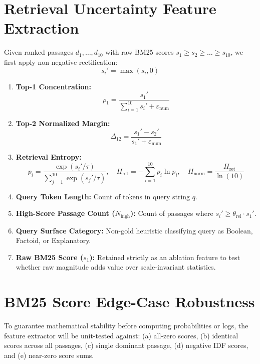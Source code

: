 \documentclass[11pt,a4paper]{article}
\begin{document}
\section{Retrieval Uncertainty Feature Extraction}
Given ranked passages $d_1, \dots, d_{10}$ with raw BM25 scores $s_1 \ge s_2 \ge \dots \ge s_{10}$, we first apply non-negative rectification:
\begin{equation}
s_i' = \max(s_i, 0)
\end{equation}
\begin{enumerate}
    \item \textbf{Top-1 Concentration:}
    \begin{equation}
    \rho_1 = \frac{s_1'}{\sum_{i=1}^{10} s_i' + \varepsilon_{\text{num}}}
    \end{equation}
    \item \textbf{Top-2 Normalized Margin:}
    \begin{equation}
    \Delta_{12} = \frac{s_1' - s_2'}{s_1' + \varepsilon_{\text{num}}}
    \end{equation}
    \item \textbf{Retrieval Entropy:}
    \begin{equation}
    p_i = \frac{\exp(s_i' / \tau)}{\sum_{j=1}^{10} \exp(s_j' / \tau)}, \quad H_{\text{ret}} = -\sum_{i=1}^{10} p_i \ln p_i, \quad H_{\text{norm}} = \frac{H_{\text{ret}}}{\ln(10)}
    \end{equation}
    \item \textbf{Query Token Length:} Count of tokens in query string $q$.
    \item \textbf{High-Score Passage Count ($N_{\text{high}}$):} Count of passages where $s_i' \ge \theta_{\text{rel}} \cdot s_1'$.
    \item \textbf{Query Surface Category:} Non-gold heuristic classifying query as Boolean, Factoid, or Explanatory.
    \item \textbf{Raw BM25 Score ($s_1$):} Retained strictly as an ablation feature to test whether raw magnitude adds value over scale-invariant statistics.
\end{enumerate}

\section{BM25 Score Edge-Case Robustness}
To guarantee mathematical stability before computing probabilities or logs, the feature extractor will be unit-tested against:
(a) all-zero scores, (b) identical scores across all passages, (c) single dominant passage, (d) negative IDF scores, and (e) near-zero score sums.
\end{document}
